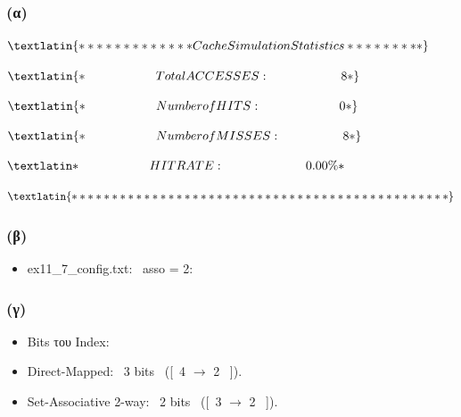 \documentclass{article}
\begin{document}
\subsubsection*{\textbf{(α)}}

$

\textlatin
{
************* Cache Simulation Statistics *********
}
$

$
\textlatin
{
* \hspace{2cm}            Total ACCESSES :  \hspace{2.02cm}               8 *
}
$

$
\textlatin
{
*     \hspace{2cm}        Number of HITS :        \hspace{2.2cm}         0 *
}
$

$
\textlatin
{
*       \hspace{2cm}      Number of MISSES :        \hspace{1.75cm}       8 *
}
$

$
\textlatin
{
*      \hspace{2cm}       HIT RATE :          \hspace{2.3cm}         0.00\% *
}
$

$
\textlatin
{
***********************************************
}
$


\subsubsection*{\textbf{(β)}}

\begin{itemize}
    \item \textlatin{ex11\_7\_config.txt}: \ \textlatin{asso = 2:}
\end{itemize}



\subsubsection*{\textbf{(γ)}}

\begin{itemize}
    \item \textlatin{Bits} {του} \textlatin{Index}:
    \item \textlatin{Direct-Mapped}: \ 3 \textlatin{bits \ ([\ 4 $\rightarrow$ 2 \ ])}.
    \item \textlatin{Set-Associative 2-way}: \ 2 \textlatin{bits \ ([\ 3 $\rightarrow$ 2 \ ])}.
\end{itemize}
\end{document}
